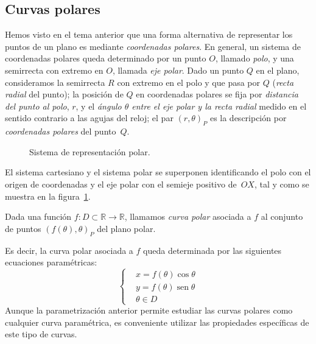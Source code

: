 \subsection{Curvas polares}

Hemos visto en el tema anterior que una forma alternativa de representar los puntos de un plano es mediante \emph{coordenadas polares}.
En general, un sistema de coordenadas polares queda determinado por un punto $O$, llamado \emph{polo}, y una semirrecta con extremo en $O$, llamada \emph{eje polar}.
Dado un punto $Q$ en el plano, consideramos la semirrecta $R$ con extremo en el polo y que pasa por $Q$ (\emph{recta radial} del punto);
la posición de $Q$ en coordenadas polares se fija por \emph{distancia del punto al polo}, $r$, y el
\emph{ángulo $\theta$ entre el eje polar y la recta radial} medido en el sentido contrario a las agujas del reloj; el par
$(r,\theta)_P$ es la descripción por \emph{coordenadas polares} del punto~$Q$.

\begin{figure}
\begin{center}
\end{center}
\caption{Sistema de representación polar.}%
\label{fig:sist-polar}
\end{figure}
%
El sistema cartesiano y el sistema polar se superponen identificando el polo con el origen de coordenadas y el eje polar con el semieje positivo de~$OX$, tal y como se muestra en la figura~\ref{fig:sist-polar}.
%
\begin{definicion}
Dada una función $f\colon \mathit{D}\subset\mathbb{R}\to\mathbb{R}$, llamamos \emph{curva polar} asociada a $f$ al conjunto de puntos $(f(\theta),\theta)_P$ del plano polar.
\end{definicion}
%
Es decir, la curva polar asociada a $f$ queda determinada por las siguientes ecuaciones paramétricas:
%
\[
\begin{cases}
& x=f(\theta)\cos\theta \\
& y=f(\theta)\operatorname{sen}\theta \\
& \theta\in \mathit{D}
\end{cases}
\]
Aunque la parametrización anterior permite estudiar las curvas polares como cualquier curva paramétrica, es conveniente utilizar las propiedades específicas de este tipo de curvas.

